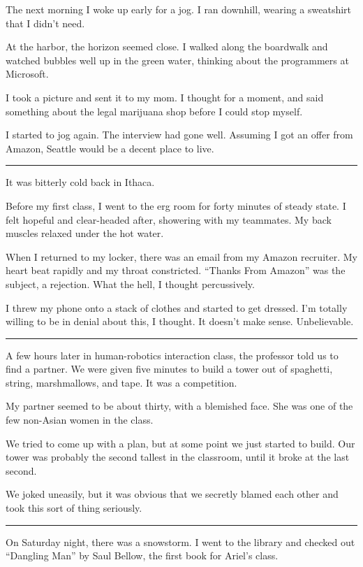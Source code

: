 The next morning I woke up early for a jog.  I ran downhill, wearing a
sweatshirt that I didn't need.

At the harbor, the horizon seemed close.  I walked along the boardwalk and
watched bubbles well up in the green water, thinking about the programmers at
Microsoft.

I took a picture and sent it to my mom.  I thought for a moment, and said
something about the legal marijuana shop before I could stop myself.

I started to jog again.  The interview had gone well.  Assuming I got an offer
from Amazon, Seattle would be a decent place to live.

\plainfancybreak{12pt}{2}{}

It was bitterly cold back in Ithaca.

Before my first class, I went to the erg room for forty minutes of steady state.
I felt hopeful and clear-headed after, showering with my teammates. My back
muscles relaxed under the hot water.

When I returned to my locker, there was an email from my Amazon recruiter. My
heart beat rapidly and my throat constricted. ``Thanks From Amazon'' was the
subject, a rejection.  What the hell, I thought percussively.

I threw my phone onto a stack of clothes and started to get dressed. I'm
totally willing to be in denial about this, I thought. It doesn't make sense.
Unbelievable.

\plainfancybreak{12pt}{2}{}

A few hours later in human-robotics interaction class, the professor told us to
find a partner. We were given five minutes to build a tower out of spaghetti,
string, marshmallows, and tape.  It was a competition.

My partner seemed to be about thirty, with a blemished face. She was one of the
few non-Asian women in the class.

We tried to come up with a plan, but at some point we just started to build. Our
tower was probably the second tallest in the classroom, until it broke at the
last second.

We joked uneasily, but it was obvious that we secretly blamed each other and
took this sort of thing seriously.

\plainfancybreak{12pt}{2}{}

On Saturday night, there was a snowstorm.  I went to the library and checked out
``Dangling Man'' by Saul Bellow, the first book for Ariel's class.

